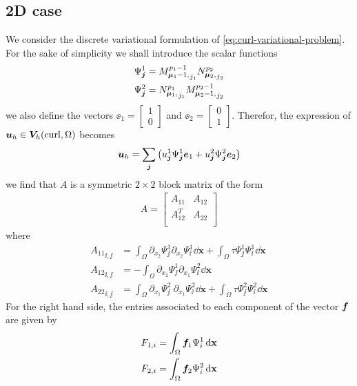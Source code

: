 \subsection{2D case}
We consider the discrete variational formulation of \eqref{eq:curl-variational-problem}. 
For the sake of simplicity we shall introduce the scalar functions
\begin{align*}
  \Psi^1_{\bm{j}} = {M_{\boldsymbol{\mu}_1-1,}^{p_1-1}}_{j_1} {N_{\boldsymbol{\mu}_2,}^{p_2}}_{j_2} 
  \\
  \Psi^2_{\bm{j}} = {N_{\boldsymbol{\mu}_1,}^{p_1}}_{j_1} {M_{\boldsymbol{\mu}_2-1,}^{p_2-1}}_{j_2}  
\end{align*}
we also define the vectors $\ee_1 = \begin{bmatrix} 1 \\ 0 \end{bmatrix}$ and $\ee_2 = \begin{bmatrix} 0 \\ 1 \end{bmatrix}$. Therefor, the expression of $\bm{u}_h \in \bm{V}_h(\mbox{curl}, \Omega)$ becomes
\begin{align*}
  \bm{u}_h = \sum\limits_{\bm{j}} \left( 
    u_{\bm{j}}^1 \Psi^1_{\bm{j}} \bm{e}_1 
  + u_{\bm{j}}^2 \Psi^2_{\bm{j}} \bm{e}_2 
  \right)
\end{align*}
we find that $A$ is a symmetric $2\times 2$ block matrix of the form
\begin{align}
  A = 
  \begin{bmatrix}
    A_{11}   & A_{12} \\
    A_{12}^T & A_{22} \\
  \end{bmatrix}
\end{align}
where
\begin{align*}
  {A_{11}}_{\ii, \jj} &=   \int_{\Omega} 
         \partial_{x_2} \Psi^{1}_{\jj} \partial_{x_2} \Psi^{1}_{\ii}
        \dd \mathbf{x} 
                       +   \int_{\Omega} 
                       \tau \Psi^{1}_{\jj} \Psi^{1}_{\ii} 
        \dd \mathbf{x} 
  \\
  {A_{12}}_{\ii, \jj} &= - \int_{\Omega} 
          \partial_{x_2} \Psi^{1}_{\jj} \partial_{x_1} \Psi^{2}_{\ii}
        \dd \mathbf{x} 
  \\
  {A_{22}}_{\ii, \jj} &=   \int_{\Omega} 
        \partial_{x_1} \Psi^{2}_{\jj} ~ \partial_{x_1} \Psi^{2}_{\ii}
        \dd \mathbf{x} 
                       +   \int_{\Omega} 
                       \tau \Psi^{2}_{\jj} \Psi^{2}_{\ii} 
        \dd \mathbf{x} 
\end{align*}
For the right hand side, the entries associated to each component of the vector $\bm{f}$ are given by
\begin{align*}
    F_{1, i} & = \int_{\Omega} \bm{f}_1 \Psi^1_{i} \,{\rm d} \mathbf{x} \\
    F_{2, i} & = \int_{\Omega} \bm{f}_2 \Psi^2_{i} \,{\rm d} \mathbf{x} \\
\end{align*}
